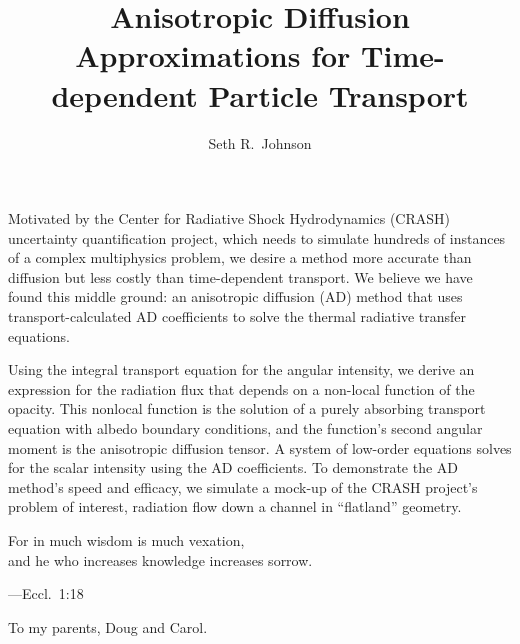 \documentclass[12pt,letterpaper,draft]{umthesis}
\author{Seth R.~Johnson}
\title{Anisotropic Diffusion Approximations for Time-dependent Particle
Transport}
\begin{document}
\allowdisplaybreaks

\frontmatter

\maketitle

\begin{finalabstract}
Motivated by the Center for Radiative Shock Hydrodynamics (CRASH) uncertainty
quantification project, which needs to simulate hundreds of instances of a
complex multiphysics problem, we desire a method more accurate than diffusion
but less costly than time-dependent transport. We believe we have found this
middle ground: an anisotropic diffusion (AD) method that uses
transport-calculated AD coefficients to solve the thermal radiative transfer
equations.

Using the integral transport equation for the angular intensity, we derive an
expression for the radiation flux that depends on a non-local function of the
opacity. This nonlocal function is the solution of a purely absorbing transport
equation with albedo boundary conditions, and the function's second angular
moment is the anisotropic diffusion tensor. A system of low-order equations
solves for the scalar intensity using the AD coefficients. To demonstrate the
AD method's speed and efficacy, we simulate a mock-up of the CRASH project's
problem of interest, radiation flow down a channel in ``flatland'' geometry.

\end{finalabstract}
\makecopyright

\begin{frontispiece}
\begin{flushleft}
For in much wisdom is much vexation,\hfill\\
\hspace{1.5em}and he who increases knowledge increases sorrow.
\end{flushleft}
---Eccl.~1:18
\end{frontispiece}

\begin{dedication}
  To my parents, Doug and Carol.
\end{dedication}
\end{document}
